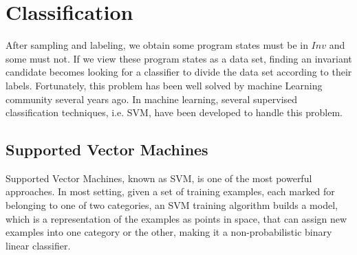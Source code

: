 
\section{Classification} %
\label{sec:classification}

After sampling and labeling, we obtain some program states must be in $Inv$ and some must not. 
If we view these program states as a data set, finding an invariant candidate becomes looking for a classifier to divide the data set according to their labels.
Fortunately, this problem has been well solved by machine Learning community several years ago.
In machine learning, several supervised classification techniques, i.e. SVM, have been developed to handle this problem.


\subsection{Supported Vector Machines}
Supported Vector Machines, known as SVM, is one of the most powerful approaches.
In most setting, given a set of training examples, each marked for belonging to one of two categories, 
an SVM training algorithm builds a model, which is a representation of the examples as points in space,
that can assign new examples into one category or the other, 
making it a non-probabilistic binary linear classifier. 


